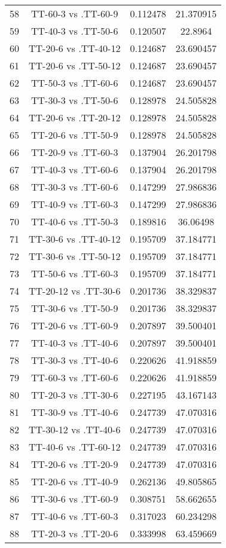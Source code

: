 \documentclass[a4paper,10pt]{article}
\begin{document}
\begin{landscape}
\begin{table}[!htp]
\begin{tabular}{cccc}
58&TT-60-3 vs .TT-60-9&0.112478&21.370915\\
59&TT-40-3 vs .TT-50-6&0.120507&22.8964\\
60&TT-20-6 vs .TT-40-12&0.124687&23.690457\\
61&TT-20-6 vs .TT-50-12&0.124687&23.690457\\
62&TT-50-3 vs .TT-60-6&0.124687&23.690457\\
63&TT-30-3 vs .TT-50-6&0.128978&24.505828\\
64&TT-20-6 vs .TT-20-12&0.128978&24.505828\\
65&TT-20-6 vs .TT-50-9&0.128978&24.505828\\
66&TT-20-9 vs .TT-60-3&0.137904&26.201798\\
67&TT-40-3 vs .TT-60-6&0.137904&26.201798\\
68&TT-30-3 vs .TT-60-6&0.147299&27.986836\\
69&TT-40-9 vs .TT-60-3&0.147299&27.986836\\
70&TT-40-6 vs .TT-50-3&0.189816&36.06498\\
71&TT-30-6 vs .TT-40-12&0.195709&37.184771\\
72&TT-30-6 vs .TT-50-12&0.195709&37.184771\\
73&TT-50-6 vs .TT-60-3&0.195709&37.184771\\
74&TT-20-12 vs .TT-30-6&0.201736&38.329837\\
75&TT-30-6 vs .TT-50-9&0.201736&38.329837\\
76&TT-20-6 vs .TT-60-9&0.207897&39.500401\\
77&TT-40-3 vs .TT-40-6&0.207897&39.500401\\
78&TT-30-3 vs .TT-40-6&0.220626&41.918859\\
79&TT-60-3 vs .TT-60-6&0.220626&41.918859\\
80&TT-20-3 vs .TT-30-6&0.227195&43.167143\\
81&TT-30-9 vs .TT-40-6&0.247739&47.070316\\
82&TT-30-12 vs .TT-40-6&0.247739&47.070316\\
83&TT-40-6 vs .TT-60-12&0.247739&47.070316\\
84&TT-20-6 vs .TT-20-9&0.247739&47.070316\\
85&TT-20-6 vs .TT-40-9&0.262136&49.805865\\
86&TT-30-6 vs .TT-60-9&0.308751&58.662655\\
87&TT-40-6 vs .TT-60-3&0.317023&60.234298\\
88&TT-20-3 vs .TT-20-6&0.333998&63.459669\\

\end{tabular}
\end{table}
\end{landscape}
\end{document}
